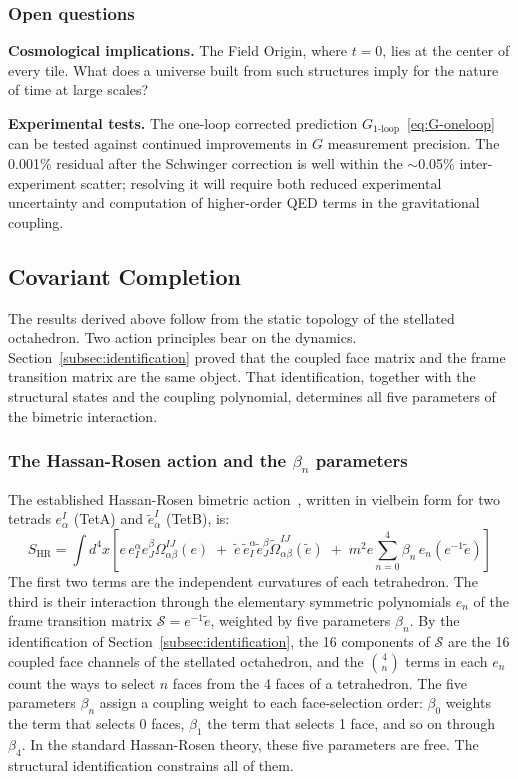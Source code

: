 \documentclass[aps,prd,preprint,superscriptaddress,showpacs,preprintnumbers,amsmath,amssymb,nofootinbib]{revtex4-2}
\begin{document}
\subsubsection*{Open questions}

\textbf{Cosmological implications.} The Field Origin, where $t = 0$, lies at the center of every tile. What does a universe built from such structures imply for the nature of time at large scales?

\textbf{Experimental tests.} The one-loop corrected prediction $G_{1\text{-loop}}$~\eqref{eq:G-oneloop} can be tested against continued improvements in $G$ measurement precision. The 0.001\% residual after the Schwinger correction is well within the $\sim$0.05\% inter-experiment scatter; resolving it will require both reduced experimental uncertainty and computation of higher-order QED terms in the gravitational coupling.

\subsection{Covariant Completion}
\label{subsec:covariant-completion}

The results derived above follow from the static topology of the stellated octahedron. Two action principles bear on the dynamics. Section~\ref{subsec:identification} proved that the coupled face matrix and the frame transition matrix are the same object. That identification, together with the structural states and the coupling polynomial, determines all five parameters of the bimetric interaction.

\subsubsection*{The Hassan-Rosen action and the $\beta_n$ parameters}

The established Hassan-Rosen bimetric action~\cite{hassan2012}, written in vielbein form for two tetrads $e^I_\alpha$ (TetA) and $\tilde{e}^I_\alpha$ (TetB), is:
\begin{equation}
S_{\text{HR}} = \int d^4x \left[ e\, e_I^\alpha e_J^\beta \Omega^{IJ}_{\alpha\beta}(e) \;+\; \tilde{e}\, \tilde{e}_I^\alpha \tilde{e}_J^\beta \tilde{\Omega}^{IJ}_{\alpha\beta}(\tilde{e}) \;+\; m^2 e \sum_{n=0}^{4} \beta_n \, e_n(e^{-1}\tilde{e}) \right]
\label{eq:hassan-rosen}
\end{equation}
The first two terms are the independent curvatures of each tetrahedron. The third is their interaction through the elementary symmetric polynomials $e_n$ of the frame transition matrix $\mathcal{S} = e^{-1}\tilde{e}$, weighted by five parameters $\beta_n$. By the identification of Section~\ref{subsec:identification}, the 16 components of $\mathcal{S}$ are the 16 coupled face channels of the stellated octahedron, and the $\binom{4}{n}$ terms in each $e_n$ count the ways to select $n$ faces from the 4 faces of a tetrahedron. The five parameters $\beta_n$ assign a coupling weight to each face-selection order: $\beta_0$ weights the term that selects 0 faces, $\beta_1$ the term that selects 1 face, and so on through $\beta_4$. In the standard Hassan-Rosen theory, these five parameters are free. The structural identification constrains all of them.
\end{document}
